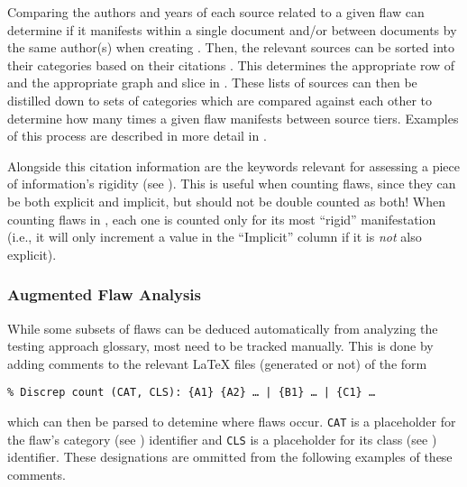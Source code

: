Comparing the authors and years of each source related to a given flaw
can determine if it manifests within a single document and/or between documents
by the same author(s) when creating . Then, the
relevant sources can be sorted into their categories based on their citations
.
This determines
the appropriate row of  and the appropriate
graph and slice in . These lists of sources can then
be distilled down to sets of categories which are compared against
each other to determine how many times a given flaw manifests between
source tiers. Examples of this process are described in more detail in
.

\label{auto-flaw-analysis-rigidity}
Alongside this citation information are the keywords relevant for assessing a
piece of information's rigidity (see ). This is useful when
counting flaws, since they can be both explicit and implicit,
but should not be double counted as both! When counting
flaws in , each one is
counted only for its most ``rigid'' manifestation (i.e., it will only increment
a value in the ``Implicit'' column if it is \emph{not} also explicit).

\subsubsection{Augmented Flaw Analysis}
\label{aug-flaw-analysis}
While some subsets of flaws can be deduced automatically from analyzing
the testing approach glossary, most need to be tracked
manually. This is done by adding
comments to the relevant \LaTeX{} files (generated or not) of the form
\begin{displayquote}
    \texttt{\% Discrep count (CAT, CLS): \{A1\} \{A2\} \dots{} | \{B1\}
        \dots{} | \{C1\} %
        \dots}
\end{displayquote}
which can then be parsed to detemine where flaws occur. \texttt{CAT} is
a placeholder for the flaw's category (see )
identifier and \texttt{CLS} is a placeholder for its class (see
) identifier. These designations are ommitted
from the following examples of these comments.

